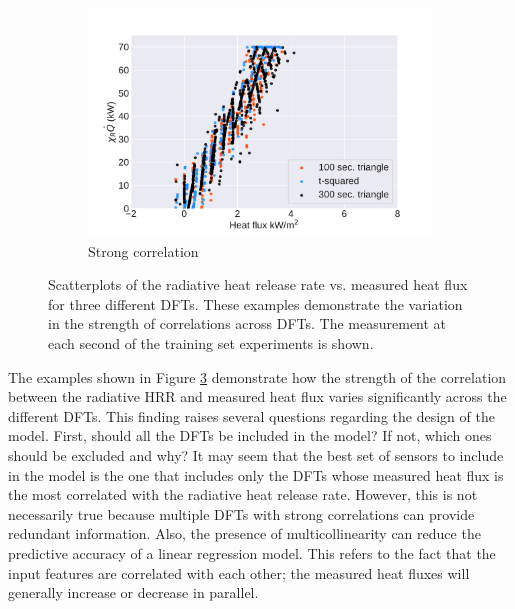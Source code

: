 \documentclass{article}
\begin{document}
\begin{figure}[htbp]
\begin{subfigure}[t]{.45\textwidth}
      \label{fig:moderate_scatter}
  \end{subfigure}
   \begin{subfigure}[t]{.45\textwidth}
      \centering
      \includegraphics[width=\textwidth ,keepaspectratio]{figures/strong_dft_scatter.pdf}
      \caption{Strong correlation}
      \label{fig:strong_scatter}
  \end{subfigure}
  \caption{Scatterplots of the radiative heat release rate vs. measured heat flux for three different DFTs. These examples demonstrate the variation in the strength of correlations across DFTs. The measurement at each second of the training set experiments is shown.} 
  \label{fig:dft_scatterplot}
\end{figure}

The examples shown in Figure \ref{fig:dft_scatterplot} demonstrate how the strength of the correlation between the radiative HRR and measured heat flux varies significantly across the different DFTs. This finding raises several questions regarding the design of the model. First, should all the DFTs be included in the model? If not, which ones should be excluded and why? It may seem that the best set of sensors to include in the model is the one that includes only the DFTs whose measured heat flux is the most correlated with the radiative heat release rate. However, this is not necessarily true because multiple DFTs with strong correlations can provide redundant information. Also, the presence of multicollinearity can reduce the predictive accuracy of a linear regression model. This refers to the fact that the input features are correlated with each other; the measured heat fluxes will generally increase or decrease in parallel. 
\end{document}
